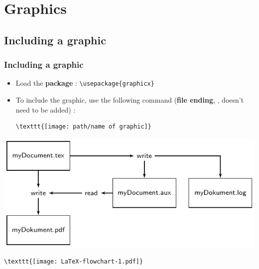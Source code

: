\section{Graphics}


\subsection{Including a graphic}

\begin{frame}[fragile]
\frametitle{Including a graphic}


\begin{itemize}
	\item Load the \textbf{package} : \lstinline|\usepackage{graphicx}|
	
	
	\item To include the graphic, use the following command (\textbf{file ending}, \ie {}, doesn't need to be added) :
	
\begin{lstlisting}
\texttt{[image: path/name of graphic]}  
\end{lstlisting}

\end{itemize}

\pause
	


\includegraphics{../../texfiles-beamer/tex-material/WissArb-latex/LaTeX-flowchart-1.pdf}   

\begin{lstlisting}
\texttt{[image: LaTeX-flowchart-1.pdf]}    
\end{lstlisting}


\end{frame}

